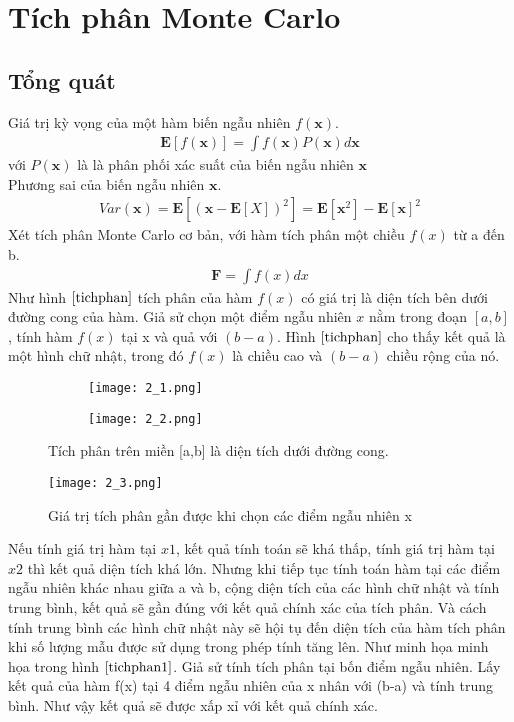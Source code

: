 \chapter{Tích phân Monte Carlo }\label{ch:2}
\section{Tổng quát}\label{sec:2.1}
Giá trị kỳ vọng của một hàm biến ngẫu nhiên $f(\textbf{x})$. 
\begin{align}
	\textbf{E}[f(\textbf{x})]=\int{f(\textbf{x})P(\textbf{x})d\textbf{x}} 
\end{align}
với $P(\textbf{x})$ là  là phân phối xác suất của biến ngẫu nhiên $\textbf{x}$\\
Phương sai của biến ngẫu nhiên $\textbf{x}$.
\begin{align}
	Var(\textbf{x})=\textbf{E}[(\textbf{x}-\textbf{E}[X])^2]=\textbf{E}[\textbf{x}^2]-\textbf{E}[\textbf{x}]^2
\end{align}
Xét tích phân Monte Carlo cơ bản, với hàm tích phân một chiều $f(x)$ từ a đến b.
\begin{align}
	\textbf{F}=\int{f(x)dx}
\end{align}
Như hình $ \ref{tichphan} $ tích phân của hàm $f(x)$ có giá trị là diện tích bên dưới đường cong của hàm. 
Giả sử chọn một điểm ngẫu nhiên $x$ nằm trong đoạn $[a, b]$, tính hàm $f(x)$ tại x và quả với $(b-a)$. Hình $ \ref{tichphan} $ cho thấy kết quả là một hình chữ nhật, trong đó $f(x)$ là chiều cao và $(b-a)$ chiều rộng của nó.
\begin{figure}[H]
	\centering
	\begin{subfigure}{5cm}
		\centering
		\texttt{[image: 2\_1.png]}
		\label{Sneutrino tadpole}
	\end{subfigure}
	\begin{subfigure}{5cm}
		\centering
		\texttt{[image: 2\_2.png]}
		\label{Sneutrino tadpole}
	\end{subfigure}
	\caption{Tích phân trên miền [a,b] là diện tích dưới đường cong.}\label{tichphan}
   \end{figure}
   \begin{figure}[H]
	\centering
	\texttt{[image: 2\_3.png]}
	\caption{Giá trị tích phân gần được khi chọn các điểm ngẫu nhiên x}\label{tichphan1}
   \end{figure}
   Nếu tính giá trị hàm tại $x1$, kết quả tính toán sẽ khá thấp, tính giá trị hàm tại $x2$ thì kết quả diện tích khá lớn. 
   Nhưng khi tiếp tục tính toán hàm tại các điểm ngẫu nhiên khác nhau giữa a và b, 
   cộng diện tích của các hình chữ nhật và tính trung bình, kết quả sẽ gần đúng với kết quả chính xác của tích phân.
   Và cách tính trung bình các hình chữ nhật này sẽ hội tụ đến diện tích của hàm tích phân khi số lượng mẫu được sử dụng trong phép tính tăng lên. 
   Như minh họa minh họa trong hình $ \ref{tichphan1} $. Giả sử tính tích phân tại bốn điểm ngẫu nhiên. 
   Lấy kết quả của hàm f(x) tại 4 điểm ngẫu nhiên của x nhân với (b-a) và tính trung bình. 
   Như vậy kết quả sẽ được xấp xỉ với kết quả chính xác.
